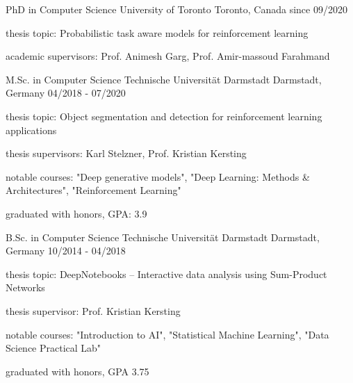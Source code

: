 

\begin{cventries}

  \cventry
    {PhD in Computer Science} %
    {University of Toronto} %
    {Toronto, Canada} %
    {since 09/2020} %
    {
        \begin{cvitems}
        \item {thesis topic: Probabilistic task aware models for reinforcement learning}
        \item {academic supervisors: Prof. Animesh Garg, Prof. Amir-massoud Farahmand}
        \end{cvitems}
    }

  \cventry
    {M.Sc. in Computer Science} %
    {Technische Universität Darmstadt} %
    {Darmstadt, Germany} %
    {04/2018 - 07/2020} %
    {
        \begin{cvitems}
        \item {thesis topic: Object segmentation and detection for reinforcement learning applications}
        \item {thesis supervisors: Karl Stelzner, Prof. Kristian Kersting}
        \item {notable courses: "Deep generative models", "Deep Learning: Methods \& Architectures", "Reinforcement Learning"}
        \item {graduated with honors, GPA: 3.9}
        \end{cvitems}
    }

  \cventry
    {B.Sc. in Computer Science} %
    {Technische Universität Darmstadt} %
    {Darmstadt, Germany} %
    {10/2014 - 04/2018} %
    {
      \begin{cvitems} %
      \item {thesis topic: DeepNotebooks -- Interactive data analysis using Sum-Product Networks}
      \item {thesis supervisor: Prof. Kristian Kersting}
      \item {notable courses: "Introduction to AI", "Statistical Machine Learning", "Data Science Practical Lab"}
      \item {graduated with honors, GPA 3.75}
      \end{cvitems}
    }


\end{cventries}
